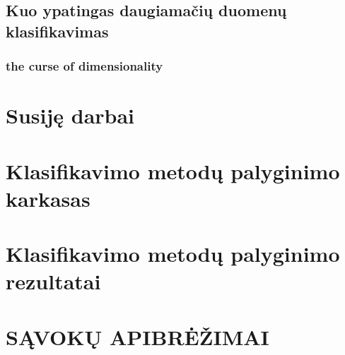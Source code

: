 \documentclass{article}
\begin{document}
\subsection{Kuo ypatingas daugiamačių duomenų klasifikavimas}
\subsubsection{the curse of dimensionality}

\section{Susiję darbai}
\section{Klasifikavimo metodų palyginimo karkasas}
\section{Klasifikavimo metodų palyginimo rezultatai}

%

\section*{SĄVOKŲ APIBRĖŽIMAI}




\end{document}
